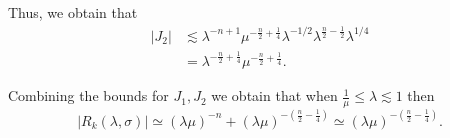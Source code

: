 \documentclass[11pt, reqno]{amsart}
\theoremstyle{plain}
\newcommand{\blue}{\textcolor{blue}}
\theoremstyle{remark}
\theoremstyle{example}
\theoremstyle{definition}
\numberwithin{equation}{section}
\begin{document}
Thus, we obtain that
\begin{equation*} \label{J2 estimate cont..}
   \begin{split}
         |J_{2}|
         & \lesssim \lambda^{-n +1} \mu^{- \frac{n}{2} + \frac{1}{4}} \lambda^{-1/2} \lambda^{ \frac{n}{2} - \frac{1}{2}} \lambda^{1/4}\\
         & = \lambda^{- \frac{n}{2} + \frac{1}{4}} \mu^{- \frac{n}{2} + \frac{1}{4}}.
   \end{split}
\end{equation*}

Combining the bounds for $J_{1}, J_{2}$ we obtain that when $\frac{1}{\mu} \leq \lambda \lesssim 1$ then
\begin{equation*}
    |R_{k}(\lambda, \sigma)| \simeq (\lambda \mu )^{-n} + (\lambda \mu )^{-\left( \frac{n}{2} - \frac{1}{4}  \right)} \simeq (\lambda \mu )^{-\left( \frac{n}{2} - \frac{1}{4}  \right)}.
\end{equation*}
\end{document}
